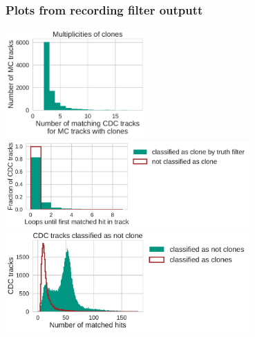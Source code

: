 \documentclass[18pt, aspectratio=169]{beamer}
\begin{document}
\begin{frame}[allowframebreaks]
  \frametitle{Plots from recording filter outputt}
  \includegraphics[width=0.4\textwidth]{figures/clone_multiplicities.pdf}\\
  \includegraphics[width=0.7\textwidth]{figures/loop_numbers.pdf}\\
  \includegraphics[width=0.7\textwidth]{figures/matched_hits.pdf}\\
\end{frame}
\end{document}
